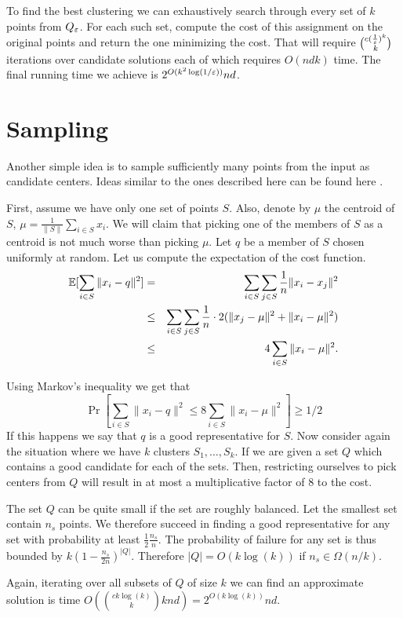 \documentclass{article}
\begin{document}
To find the best clustering we can exhaustively search through every set of $k$ points from $Q_{\varepsilon}$.
For each such set, compute the cost of this assignment on the original points and return the one minimizing the cost.
That will require ${c(\frac{1}{\varepsilon})^k \choose k}$ iterations over candidate solutions each of which requires $O(ndk)$ time. 
The final running time we achieve is $2^{O(k^2\log(1/\varepsilon))}nd$. 


\section{Sampling}
Another simple idea is to sample sufficiently many points from the input as candidate centers.
Ideas similar to the ones described here can be found here \cite{ZhaHDGS01}.

First, assume we have only one set of points $S$. 
Also, denote by $\mu$ the centroid of $S$, $\mu = \frac{1}{\|S\|}\sum_{i \in S} x_i$.
We will claim that picking one of the members of $S$ as a centroid is not much worse than
picking $\mu$.
Let $q$ be a member of $S$ chosen uniformly at random.
Let us compute the expectation of the cost function.
\begin{eqnarray}
{\mathbb E}[\sum_{i \in S} \|x_i - q\|^2] &=& \sum_{i \in S} \sum_{j \in S} \frac{1}{n}\|x_i - x_j\|^2  \\
&\le& \sum_{i \in S} \sum_{j \in S} \frac{1}{n}\cdot2(\|x_j - \mu\|^2 + \|x_i - \mu\|^2) \\
&\le& 4 \sum_{i \in S}  \|x_i - \mu\|^2.
\end{eqnarray}

Using Markov's inequality we get that
\[
\Pr[\sum_{i \in S} \|x_i - q\|^2 \le 8\sum_{i \in S}  \|x_i - \mu\|^2] \ge 1/2
\]
If this happens we say that $q$ is a good representative for $S$.
Now consider again the situation where we have $k$ clusters $S_1,\dots,S_k$.
If we are given a set $Q$ which contains a good candidate for each of the sets.
Then, restricting ourselves to pick centers from $Q$ will result in at most a multiplicative factor of $8$ to the cost.

The set $Q$ can be quite small if the set are roughly balanced.
Let the smallest set contain $n_s$ points. 
We therefore succeed in finding a good representative for any set with probability at least $\frac{1}{2}\frac{n_s}{n}$.
The probability of failure for any set is thus bounded by $k (1 - \frac{n_s}{2n})^{|Q|}$.
Therefore $|Q| = O(k \log(k))$ if $n_s \in \Omega(n/k)$.

Again, iterating over all subsets of $Q$ of size $k$ we can find an approximate 
solution is time $O({ck \log(k) \choose k}knd) = 2^{O(k \log(k))}nd$.
\end{document}
